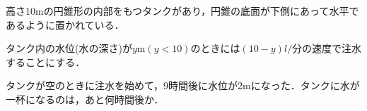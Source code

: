 \documentclass[../../main.tex]{subfiles}
\begin{document}
高さ10mの円錐形の内部をもつタンクがあり，円錐の底面が下側にあって水平であるように置かれている．

タンク内の水位(水の深さ)が$y$m$(y<10)$のときには$(10-y)l/\text{分}$の速度で注水することにする．

タンクが空のときに注水を始めて，9時間後に水位が2mになった．タンクに水が一杯になるのは，あと何時間後か．
\end{document}
